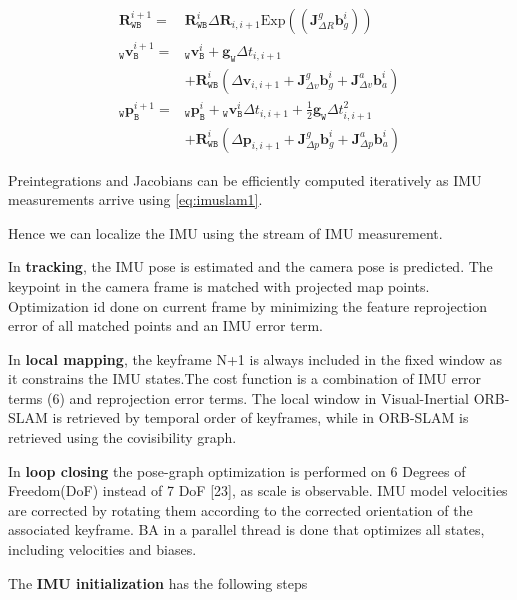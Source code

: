 \begin{align} \label{eq:imuslam1} \mathbf {R}^{i+1}_\mathtt {WB} = & \mathbf {R}^{i}_\mathtt {WB} \Delta \mathbf {R}_{i,i+1} \text{Exp}\left(\left(\mathbf {J}^g_{\Delta R}\mathbf {b}^i_g\right)\right) \nonumber\\ _\mathtt {W}\mathbf {v}^{i+1}_\mathtt {B} = & {_\mathtt {W}\mathbf {v}^{i}_\mathtt {B}} + \mathbf {g}_\mathtt {W} \Delta t_{i,i+1} \nonumber\\ &+ \mathbf {R}^{i}_\mathtt {WB} \left(\Delta \mathbf {v}_{i,i+1} + \mathbf {J}^g_{\Delta v} \mathbf {b}^i_g + \mathbf {J}^a_{\Delta v} \mathbf {b}^i_a\right) \nonumber\\ _\mathtt {W}\mathbf {p}^{i+1}_\mathtt {B} = & {_\mathtt {W}\mathbf {p}^{i}_\mathtt {B}} + {_\mathtt {W}\mathbf {v}^{i}_\mathtt {B}} \Delta t_{i,i+1} + \frac{1}{2}\mathbf {g}_\mathtt {W} \Delta t^2_{i,i+1} \nonumber\\ & + \mathbf {R}^{i}_\mathtt {WB} \left(\Delta \mathbf {p}_{i,i+1} + \mathbf {J}^g_{\Delta p} \mathbf {b}^i_g + \mathbf {J}^a_{\Delta p} \mathbf {b}^i_a\right) \end{align}

Preintegrations and Jacobians can be efficiently computed iteratively as IMU measurements arrive using \ref{eq:imuslam1}.

Hence we can localize the IMU using the stream of IMU measurement.

In \textbf{tracking}, the IMU pose is estimated and the camera pose is predicted. The keypoint in the camera frame is matched with projected map points. Optimization id done on current frame by minimizing the feature reprojection error of all matched points and an IMU error term. 

In \textbf{local mapping}, the keyframe N+1 is always included in the fixed window as it constrains the IMU states.The cost function is a combination of IMU error terms (6) and reprojection error terms. The local window in Visual-Inertial ORB-SLAM is retrieved by temporal order of keyframes, while in ORB-SLAM is retrieved using the covisibility graph.

In \textbf{loop closing} the pose-graph optimization is performed on 6 Degrees of Freedom(DoF) instead of 7 DoF [23], as scale is observable.  IMU model velocities are corrected by rotating them according to the corrected orientation of the associated keyframe.  BA in a parallel thread is done that optimizes all states, including velocities and biases. 

The \textbf{IMU initialization} has the following steps


